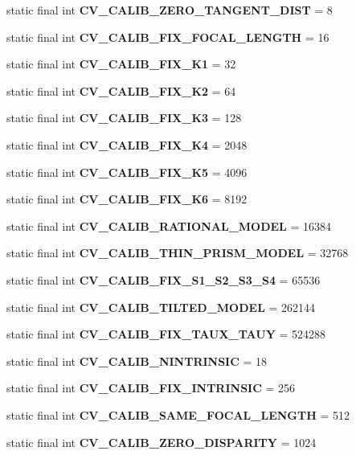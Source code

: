 \begin{DoxyCompactItemize}
\item 
static final int {\bfseries C\+V\+\_\+\+C\+A\+L\+I\+B\+\_\+\+Z\+E\+R\+O\+\_\+\+T\+A\+N\+G\+E\+N\+T\+\_\+\+D\+I\+ST} = 8
\item 
static final int {\bfseries C\+V\+\_\+\+C\+A\+L\+I\+B\+\_\+\+F\+I\+X\+\_\+\+F\+O\+C\+A\+L\+\_\+\+L\+E\+N\+G\+TH} = 16
\item 
static final int {\bfseries C\+V\+\_\+\+C\+A\+L\+I\+B\+\_\+\+F\+I\+X\+\_\+\+K1} = 32
\item 
static final int {\bfseries C\+V\+\_\+\+C\+A\+L\+I\+B\+\_\+\+F\+I\+X\+\_\+\+K2} = 64
\item 
static final int {\bfseries C\+V\+\_\+\+C\+A\+L\+I\+B\+\_\+\+F\+I\+X\+\_\+\+K3} = 128
\item 
static final int {\bfseries C\+V\+\_\+\+C\+A\+L\+I\+B\+\_\+\+F\+I\+X\+\_\+\+K4} = 2048
\item 
static final int {\bfseries C\+V\+\_\+\+C\+A\+L\+I\+B\+\_\+\+F\+I\+X\+\_\+\+K5} = 4096
\item 
static final int {\bfseries C\+V\+\_\+\+C\+A\+L\+I\+B\+\_\+\+F\+I\+X\+\_\+\+K6} = 8192
\item 
static final int {\bfseries C\+V\+\_\+\+C\+A\+L\+I\+B\+\_\+\+R\+A\+T\+I\+O\+N\+A\+L\+\_\+\+M\+O\+D\+EL} = 16384
\item 
static final int {\bfseries C\+V\+\_\+\+C\+A\+L\+I\+B\+\_\+\+T\+H\+I\+N\+\_\+\+P\+R\+I\+S\+M\+\_\+\+M\+O\+D\+EL} = 32768
\item 
static final int {\bfseries C\+V\+\_\+\+C\+A\+L\+I\+B\+\_\+\+F\+I\+X\+\_\+\+S1\+\_\+\+S2\+\_\+\+S3\+\_\+\+S4} = 65536
\item 
static final int {\bfseries C\+V\+\_\+\+C\+A\+L\+I\+B\+\_\+\+T\+I\+L\+T\+E\+D\+\_\+\+M\+O\+D\+EL} = 262144
\item 
static final int {\bfseries C\+V\+\_\+\+C\+A\+L\+I\+B\+\_\+\+F\+I\+X\+\_\+\+T\+A\+U\+X\+\_\+\+T\+A\+UY} = 524288
\item 
static final int {\bfseries C\+V\+\_\+\+C\+A\+L\+I\+B\+\_\+\+N\+I\+N\+T\+R\+I\+N\+S\+IC} = 18
\item 
static final int {\bfseries C\+V\+\_\+\+C\+A\+L\+I\+B\+\_\+\+F\+I\+X\+\_\+\+I\+N\+T\+R\+I\+N\+S\+IC} = 256
\item 
static final int {\bfseries C\+V\+\_\+\+C\+A\+L\+I\+B\+\_\+\+S\+A\+M\+E\+\_\+\+F\+O\+C\+A\+L\+\_\+\+L\+E\+N\+G\+TH} = 512
\item 
static final int {\bfseries C\+V\+\_\+\+C\+A\+L\+I\+B\+\_\+\+Z\+E\+R\+O\+\_\+\+D\+I\+S\+P\+A\+R\+I\+TY} = 1024
\item 

\end{DoxyCompactItemize}

